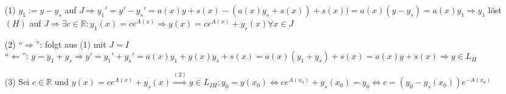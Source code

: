 \documentclass{article}
\begin{document}
\begin{beweis}
\begin{itemize}
\item[(1)] $y_1 := y - y_s $ auf $ J \Rightarrow y_1' = y' - y_s' = a(x)y + s(x) - (a(x)y_s + s(x)) + s(x)) = a(x)(y-y_s) = a(x)y_1 \Rightarrow y_1$ löst $(H)$ auf $J \Rightarrow \exists c \in \mathbb{R}: y_1(x) = c e^{A(x)} \Rightarrow y(x) = c e ^{A(x)} + y_s(x) \forall x \in J$
\item[(2)] "`$\Rightarrow$"': folgt aus (1) mit $J=I$ \\
"`$\Leftarrow$"': $y= y_1 + y_s \Rightarrow y' = y_1' + y_s' = a(x)y_1 + y(x) y_s + s(x) = a(x)(y_1 + y_s) + s(x) = a(x) y + s(x)
\Rightarrow y \in L_H$
\item[(3)] Sei $c \in \mathbb{R}$ und $y(x) = c e ^{A(x)} + y_s(x)
\stackrel{(2)}{\Rightarrow} y \in L_{IH}; y_0 = y(x_0) \Leftrightarrow c e ^{A(x_0)}+y_s(x_0)=y_0 \Leftrightarrow c = (y_0 - y_s(x_0))e^{-A(x_0)}$
\end{itemize}
\end{beweis}
\end{document}
